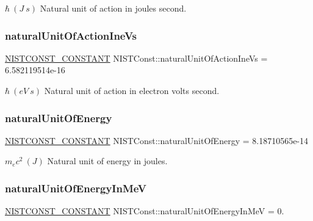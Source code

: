 $\hbar \ (J\ s)$ Natural unit of action in joules second. \mbox{\label{group___n_i_s_t_const-_natural_unit_gadf0b7bf18e0371c6528e8532ae1b9984}} 
\subsubsection{\texorpdfstring{natural\+Unit\+Of\+Action\+Ine\+Vs}{naturalUnitOfActionIneVs}}
{\footnotesize\ttfamily \mbox{\hyperlink{_n_i_s_t_const_8hpp_a2b0fc1d7452373f816175dd86ce26729}{N\+I\+S\+T\+C\+O\+N\+S\+T\+\_\+\+C\+O\+N\+S\+T\+A\+NT}} N\+I\+S\+T\+Const\+::natural\+Unit\+Of\+Action\+Ine\+Vs = 6.\+582119514e-\/16}

$\hbar \ (eV\ s)$ Natural unit of action in electron volts second. \mbox{\label{group___n_i_s_t_const-_natural_unit_gafbdfe6f0b94bdc194fcb719c7a09ad01}} 
\subsubsection{\texorpdfstring{natural\+Unit\+Of\+Energy}{naturalUnitOfEnergy}}
{\footnotesize\ttfamily \mbox{\hyperlink{_n_i_s_t_const_8hpp_a2b0fc1d7452373f816175dd86ce26729}{N\+I\+S\+T\+C\+O\+N\+S\+T\+\_\+\+C\+O\+N\+S\+T\+A\+NT}} N\+I\+S\+T\+Const\+::natural\+Unit\+Of\+Energy = 8.\+18710565e-\/14}

$m_e c^2 \ (J)$ Natural unit of energy in joules. \mbox{\label{group___n_i_s_t_const-_natural_unit_gae7af288f55f49ca09dae5a25f69941c6}} 
\subsubsection{\texorpdfstring{natural\+Unit\+Of\+Energy\+In\+MeV}{naturalUnitOfEnergyInMeV}}
{\footnotesize\ttfamily \mbox{\hyperlink{_n_i_s_t_const_8hpp_a2b0fc1d7452373f816175dd86ce26729}{N\+I\+S\+T\+C\+O\+N\+S\+T\+\_\+\+C\+O\+N\+S\+T\+A\+NT}} N\+I\+S\+T\+Const\+::natural\+Unit\+Of\+Energy\+In\+MeV = 0.}

